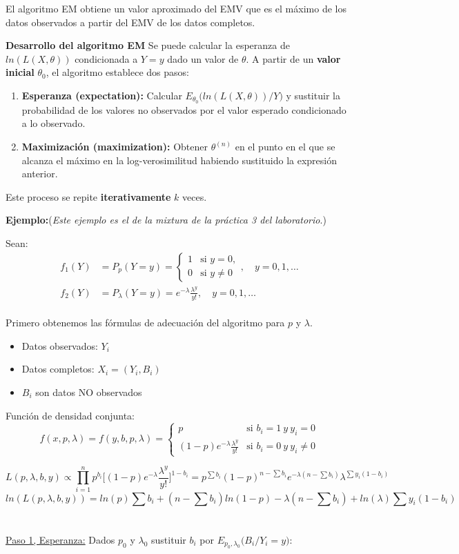 El algoritmo EM obtiene un valor aproximado del EMV que es el máximo de los datos observados a partir del EMV de los datos completos.

\textbf{Desarrollo del algoritmo EM}
Se puede calcular la esperanza de $ln(L(X,\theta))$ condicionada a $Y=y$ dado un valor de $\theta$. A partir de un \textbf{valor inicial} $\theta_0$, el algoritmo establece dos pasos:
\begin{enumerate}
    \item \textbf{Esperanza (expectation):} Calcular $E_{\theta_0}\Big(ln(L(X,\theta))\big/Y\Big)$ y sustituir la probabilidad de los valores no observados por el valor esperado condicionado a lo observado.
    \item \textbf{Maximización (maximization):} Obtener $\theta^{(n)}$ en el punto en el que se alcanza el máximo en la log-verosimilitud habiendo sustituido la expresión anterior.
\end{enumerate} 
Este proceso se repite \textbf{iterativamente} $k$ veces. 

\textbf{Ejemplo:}(\textit{Este ejemplo es el de la mixtura de la práctica 3 del laboratorio}.)

Sean:
\begin{align*}
    f_1(Y) &= P_p(Y=y) = 
    \begin{cases}
        1 & \text{si } y=0, \\
        0 & \text{si } y \neq 0
    \end{cases} , \quad y = 0, 1, \dots\\
    f_2(Y) &= P_\lambda(Y=y) = e^{-\lambda} \frac{\lambda^y}{y!}, \quad y = 0, 1, \dots
    \end{align*}   
 \\
Primero obtenemos las fórmulas de adecuación del algoritmo para $p$ y $\lambda$.
\begin{itemize}
    \item Datos observados: $Y_i$
    \item Datos completos: $X_i=(Y_i,B_i)$
    \item $B_i$ son datos NO observados
\end{itemize}
Función de densidad conjunta:
$$ f(x,p,\lambda)=f(y,b,p,\lambda)=\begin{cases}
    p & \text{si } b_i=1\ y\ y_i=0 \\
    (1-p)e^{-\lambda}\frac{\lambda^y}{y!} & \text{si } b_i=0\ y\ y_i \neq 0
\end{cases} $$

$$L(p,\lambda,b,y)\propto\prod_{i=1}^{n}p^{b_i}\Big[(1-p)e^{-\lambda}\frac{\lambda^y}{y!}\Big]^{1-b_i}=p^{\sum b_i}(1-p)^{n-\sum b_i}e^{-\lambda(n-\sum b_i)}\lambda^{\sum y_i(1-b_i)}$$
$$ln(L(p,\lambda,b,y))=ln(p)\sum b_i+(n-\sum b_i)ln(1-p)-\lambda(n-\sum b_i)+ln(\lambda)\sum y_i(1-b_i)$$\\\ \\
\underline{Paso 1, Esperanza:} Dados $p_0$ y $\lambda_0$ sustituir $b_i$ por $E_{p_0,\lambda_0}\Big(B_i\Big/Y_i=y\Big)$:

